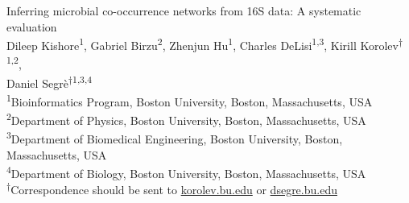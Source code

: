 
\begin{titlepage}

  \newcommand{\HRule}{\rule{\linewidth}{0.5mm}} %

  \center %





  \vspace*{\fill}
  {\huge Inferring microbial co-occurrence networks from 16S data: A systematic evaluation}\\[0.4cm]


  \vspace{1.5 cm}
  Dileep Kishore\textsuperscript{1},
  Gabriel Birzu\textsuperscript{2},
  Zhenjun Hu\textsuperscript{1},
  Charles DeLisi\textsuperscript{1,3},
  Kirill Korolev\textsuperscript{$\dagger$1,2},\\
  Daniel Segr\`{e}\textsuperscript{$\dagger$1,3,4}\\
  \vspace{1cm}
  \textsuperscript{1}Bioinformatics Program, Boston University, Boston, Massachusetts, USA\\
  \textsuperscript{2}Department of Physics, Boston University, Boston, Massachusetts, USA\\
  \textsuperscript{3}Department of Biomedical Engineering, Boston University, Boston, Massachusetts, USA\\
  \textsuperscript{4}Department of Biology, Boston University, Boston, Massachusetts, USA\\
  \textsuperscript{$\dagger$}Correspondence should be sent to \href{mailto:korolev.bu.edu}{korolev.bu.edu} or \href{mailto:dsegre.bu.edu}{dsegre.bu.edu}\\


\end{titlepage}
